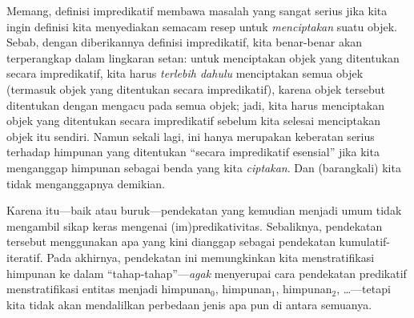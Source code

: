 \documentclass[../../../include/open-logic-section]{subfiles}
\begin{document}
Memang, definisi impredikatif membawa masalah yang sangat serius jika kita
ingin definisi kita menyediakan semacam resep untuk \emph{menciptakan} suatu
objek. Sebab, dengan diberikannya definisi impredikatif, kita benar-benar akan
terperangkap dalam lingkaran setan: untuk menciptakan objek yang
ditentukan secara impredikatif, kita harus \emph{terlebih dahulu} menciptakan
semua objek (termasuk objek yang ditentukan secara impredikatif), karena objek
tersebut ditentukan dengan mengacu pada semua objek; jadi, kita harus
menciptakan objek yang ditentukan secara impredikatif sebelum kita selesai
menciptakan objek itu sendiri. Namun sekali lagi, ini hanya merupakan
keberatan serius terhadap himpunan yang ditentukan ``secara impredikatif
esensial'' jika kita menganggap himpunan sebagai benda yang kita
\emph{ciptakan}. Dan (barangkali) kita tidak menganggapnya demikian.

Karena itu---baik atau buruk---pendekatan yang kemudian menjadi umum tidak
mengambil sikap keras mengenai (im)\-pre\-di\-ka\-tiv\-itas. Sebaliknya,
pendekatan tersebut menggunakan apa yang kini dianggap sebagai pendekatan
kumulatif-iteratif. Pada akhirnya, pendekatan ini memungkinkan kita
menstratifikasi himpunan ke dalam ``tahap-tahap''---\emph{agak} menyerupai
cara pendekatan predikatif menstratifikasi entitas menjadi himpunan$_0$,
himpunan$_1$, himpunan$_2$, \ldots---tetapi kita tidak akan mendalilkan
perbedaan jenis apa pun di antara semuanya.
\end{document}
